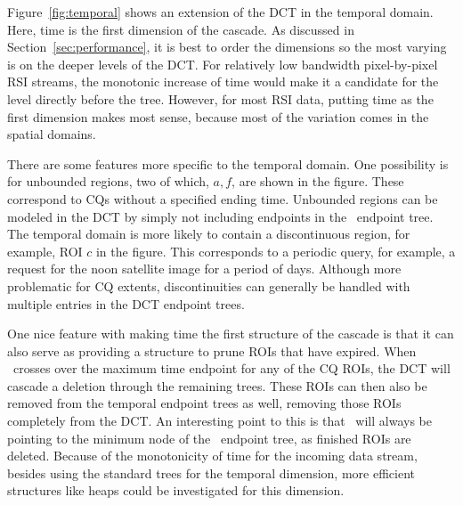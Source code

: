 \documentclass{ucdthesis}       %
\begin{document}
Figure~\ref{fig:temporal} shows an extension of the \ac{DCT} in the
temporal domain.  Here, time is the first dimension of the cascade.
As discussed in Section~\ref{sec:performance}, it is best to order the
dimensions so the most varying is on the deeper levels of the \ac{DCT}.
For relatively low bandwidth pixel-by-pixel \ac{RSI} streams, the
monotonic increase of time would make it a candidate for the level
directly before the  tree.  However, for most \ac{RSI} data,
putting time as the first dimension makes most sense, because most of
the variation comes in the spatial domains.  

There are some features more specific to the temporal domain.  One
possibility is for unbounded regions, two of which, $a,f$, are shown
in the figure.  These correspond to \acp{CQ} without a
specified ending time.  Unbounded regions can be modeled in the \ac{DCT} 
by simply not including endpoints in the \Tx\ endpoint tree.  The
temporal domain is more likely to contain a discontinuous region, for
example, \ac{ROI} $c$ in the figure.  This corresponds to a periodic
query, for example, a request for the noon satellite image for a period
of days.  Although more problematic for \ac{CQ} extents,
discontinuities can generally be handled with multiple entries in the
\ac{DCT} endpoint trees.
 
One nice feature with making time the first structure of the cascade
is that it can also serve as providing a structure to prune \acp{ROI}
that have expired.  When \wt\ crosses over the maximum time endpoint
for any of the \ac{CQ} \acp{ROI}, the \ac{DCT} will cascade a deletion
through the remaining trees.  These \acp{ROI} can then also be removed
from the temporal endpoint trees as well, removing those \acp{ROI}
completely from the \ac{DCT}.  An interesting point to this is that \wt\
will always be pointing to the minimum node of the \Tx\ endpoint tree,
as finished \acp{ROI} are deleted.  Because of the monotonicity of time
for the incoming data stream, besides using the standard trees for the
temporal dimension, more efficient structures like heaps could be
investigated for this dimension.
\end{document}
